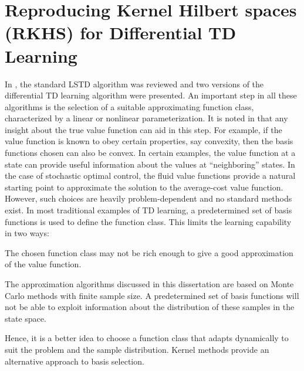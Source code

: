 \chapter{Reproducing Kernel Hilbert spaces (RKHS) for Differential TD Learning}
\label{ch:rkhs} 
In , the standard LSTD algorithm was reviewed and two versions of the differential TD learning algorithm were presented. An important step in all these algorithms is the selection of a suitable approximating function class, characterized by  a linear or nonlinear parameterization. It is noted in \cite{ctcn} that any insight about the true value function can aid in this step. For example, if the value function is known to obey certain properties, say convexity, then the basis functions chosen can also be convex.  In certain examples, the value function at a state can provide useful information about the values at ``neighboring'' states. In the case of stochastic optimal control, the fluid value functions provide a natural starting point to approximate the solution to the average-cost value function. However, such choices are heavily problem-dependent and no standard methods exist. In most traditional examples of TD learning, a predetermined set of basis functions is used to define the function class. This limits the learning capability in two ways:
\begin{romannum}
	\item The chosen function class may not be rich enough to give a good approximation of the value function.
	\item The approximation algorithms discussed in this dissertation are based on Monte Carlo methods with finite sample size. A predetermined set of basis functions will not be able to exploit information about the distribution of these samples in the state space.  
\end{romannum}
Hence, it is a better idea to choose a function class that adapts dynamically to suit the problem and the sample distribution. Kernel methods provide an alternative approach to basis selection. 

